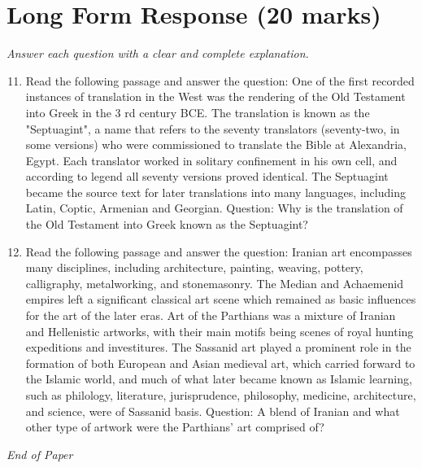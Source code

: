 \documentclass[12pt]{article}
\begin{document}
\section*{Long Form Response (20 marks)}
\textit{Answer each question with a clear and complete explanation.}
\begin{enumerate}[label=\arabic*.]
\setcounter{enumi}{10}
\item Read the following passage and answer the question: One of the first recorded instances of translation in the West was the rendering of the Old Testament into Greek in the 3 rd century BCE. The translation is known as the "Septuagint", a name that refers to the seventy translators (seventy-two, in some versions) who were commissioned to translate the Bible at Alexandria, Egypt. Each translator worked in solitary confinement in his own cell, and according to legend all seventy versions proved identical. The Septuagint became the source text for later translations into many languages, including Latin, Coptic, Armenian and Georgian. Question: Why is the translation of the Old Testament into Greek known as the Septuagint?
\item Read the following passage and answer the question: Iranian art encompasses many disciplines, including architecture, painting, weaving, pottery, calligraphy, metalworking, and stonemasonry. The Median and Achaemenid empires left a significant classical art scene which remained as basic influences for the art of the later eras. Art of the Parthians was a mixture of Iranian and Hellenistic artworks, with their main motifs being scenes of royal hunting expeditions and investitures. The Sassanid art played a prominent role in the formation of both European and Asian medieval art, which carried forward to the Islamic world, and much of what later became known as Islamic learning, such as philology, literature, jurisprudence, philosophy, medicine, architecture, and science, were of Sassanid basis. Question: A blend of Iranian and what other type of artwork were the Parthians' art comprised of?
\end{enumerate}

\vfill
\noindent\textit{End of Paper}
\end{document}
